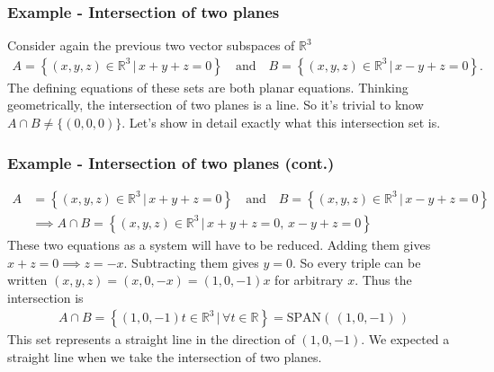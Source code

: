 \documentclass[usenames,dvipsnames,aspectratio=169,10pt]{beamer}
\numberwithin{equation}{section}
\begin{document}
\begin{frame}
\frametitle{Example - Intersection of two planes}
Consider again the previous two vector subspaces of $\mathbb{R}^3$
\begin{align*}
A = \left\{ (x,y,z) \in\mathbb{R}^3 \, | \, x+y+z=0  \right\} \quad\text{and}\quad
B = \left\{ (x,y,z) \in\mathbb{R}^3 \, | \, x-y+z=0  \right\}.
\end{align*}
The defining equations of these sets are both planar equations. Thinking geometrically, the intersection of two planes is a line. So it's trivial to know $A \cap B \neq \{ (0,0,0)\}$. Let's show in detail exactly what this intersection set is.

\end{frame}



\begin{frame}
\frametitle{Example - Intersection of two planes (cont.)}
\begin{align*}
A &= \left\{ (x,y,z) \in\mathbb{R}^3 \, | \, x+y+z=0  \right\} \quad\text{and}\quad
B = \left\{ (x,y,z) \in\mathbb{R}^3 \, | \, x-y+z=0  \right\} \\
&\implies A \cap B = \left\{ (x,y,z) \in\mathbb{R}^3 \, | \, x+y+z=0, \, x-y+z=0 \right\}
\end{align*}
These two equations as a system will have to be reduced. Adding them gives $x+z=0 \implies z = -x$. Subtracting them gives $y=0$. So every triple can be written $(x,y,z)=(x,0,-x)=(1,0,-1)x$ for arbitrary $x$. Thus the intersection is
\begin{align*}
A \cap B = \left\{ (1,0,-1)t \in\mathbb{R}^3 \, | \, \forall t\in \mathbb{R} \right\}= \text{SPAN}( \, (1,0,-1) \, )
\end{align*}
This set represents a straight line in the direction of $(1,0,-1)$. We expected a straight line when we take the intersection of two planes.

\end{frame}
\end{document}
